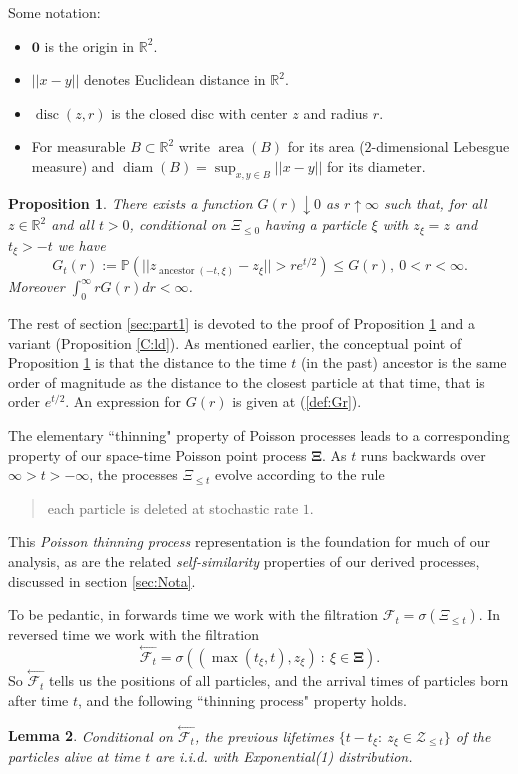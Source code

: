 \documentclass[12pt]{article}
\newtheorem{Lemma}{Lemma}
\newtheorem{Proposition}[Lemma]{Proposition}
\newcommand{\FF}{\mbox{${\mathcal F}$}}
\newcommand{\ZZ}{\mbox{${\mathcal Z}$}}
\newcommand{\Reals}{{\mathbb{R}}}
\newcommand{\origin}{{\mathbf 0}}
\renewcommand{\Pr}{{\mathbb P}}
\DeclareMathOperator{\diam}{diam}
\DeclareMathOperator{\area}{area}
\DeclareMathOperator{\disc}{disc}
\DeclareMathOperator{\ancestor}{ancestor}
\begin{document}
Some notation:
\begin{itemize}
\item $\origin$ is the origin in $\Reals^2$.
\item $|| x - y ||$ denotes Euclidean distance in $\Reals^2$.
\item $\disc(z,r)$ is the closed disc with center $z$ and radius $r$.
\item For  measurable $B \subset \Reals^2$ write $\area(B)$ for its area ($2$-dimensional Lebesgue measure) and 
$\diam(B) = \sup_{x,y \in B}  || x - y ||$ for its diameter.
\end{itemize}
\begin{Proposition}
\label{P1}
There exists a function $G(r) \downarrow  0$ as $r \uparrow  \infty$ such that,
for all $z \in \Reals^2$ and all $t > 0$, conditional on $\Xi_{\le 0}$ having a particle $\xi$ with  $z_\xi = z$ and $t_\xi > -t$ we have 
\[ G_t(r) := 
\Pr (||
z_{\ancestor(-t,\xi)} - z_\xi|| > r e^{t/2} ) \le G(r) , \ 0 < r < \infty . \]
Moreover $\int_0^\infty r G(r) dr < \infty$.
\end{Proposition}
The rest of section \ref{sec:part1} is devoted to the proof of Proposition \ref{P1} and a variant (Proposition \ref{C:ld}). 
As mentioned earlier, the conceptual point of Proposition \ref{P1} is that the distance to the time $t$ (in the past) ancestor 
is the same order of magnitude as the distance to the closest particle at that time, that is order $e^{t/2}$. 
An expression for $G(r)$ is given at (\ref{def:Gr}).

The elementary ``thinning" property of Poisson processes leads to a corresponding 
property of our space-time Poisson point process $\bm{\Xi}$.  
As $t$ runs backwards over $\infty > t > -\infty$, the processes $\Xi_{\le t}$ evolve according to the rule
\begin{quote}
each particle is deleted at stochastic rate $1$.
\end{quote}
This {\em Poisson thinning process} representation is the foundation for much of our analysis, as are the related 
{\em self-similarity} properties of our derived processes, discussed in section \ref{sec:Nota}.

To be pedantic, in forwards time we work with the filtration
$\FF_t = \sigma(\Xi_{\le t})$. 
In reversed time we work with the filtration 
\begin{equation}
\stackrel{\leftarrow} {\FF_{t}}= \sigma( (\max(t_\xi,t), z_\xi) \ : \ \xi \in \bm{\Xi} ) .
\label{f-back}
\end{equation}
So $\stackrel{\leftarrow} {\FF_{t}}$ tells us the positions of all particles, and the arrival times of particles born after time $t$,
and the following ``thinning process" property holds.
\begin{Lemma}
\label{L:rev}
Conditional on $\stackrel{\leftarrow} {\FF_{t}}$, the 
 previous lifetimes
$\{t - t_\xi : \ z_\xi \in \ZZ_{\le t} \}$ of the particles alive at time $t$ are i.i.d. with Exponential(1) distribution.
\end{Lemma}
\end{document}
